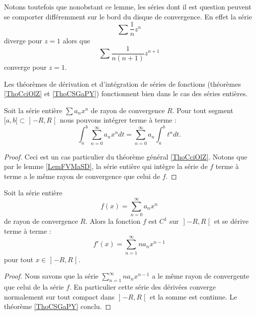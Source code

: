 Notons toutefois que nonobstant ce lemme, les séries dont il est question peuvent se comporter différemment sur le bord du disque de convergence. En effet la série
\begin{equation}
    \sum \frac{1}{ n }z^n
\end{equation}
diverge pour \( z=1\) alors que 
\begin{equation}
    \sum\frac{1}{ n(n+1) }z^{n+1}
\end{equation}
converge pour \( z=1\).


Les théorèmes de dérivation et d'intégration de séries de fonctions (théorèmes \ref{ThoCciOlZ} et \ref{ThoCSGaPY}) fonctionnent bien dans le cas des séries entières.

\begin{proposition} \label{PropfeFQWr}
    Soit la série entière $\sum a_nx^n$ de rayon de convergence \( R\). Pour tout segment \( \mathopen[ a , b \mathclose]\subset\mathopen] -R , R \mathclose[\) nous pouvons intégrer terme à terme :
    \begin{equation}
        \int_a^b\sum_{n=0}^{\infty}a_nx^ndt=\sum_{n=0}^{\infty}a_n\int_a^bt^ndt.
    \end{equation}
\end{proposition}

\begin{proof}
    Ceci est un cas particulier du théorème général \ref{ThoCciOlZ}. Notons que par le lemme \ref{LemFVMaSD}, la série entière qui intègre la série de \( f\) terme à terme a le même rayon de convergence que celui de \( f\).
\end{proof}

\begin{proposition}     \label{ProptzOIuG}
    Soit la série entière
    \begin{equation}
        f(x)=\sum_{n=0}^{\infty}a_n x^n
    \end{equation}
    de rayon de convergence \( R\). Alors la fonction \( f\) est \( C^1\) sur \( \mathopen] -R , R \mathclose[\) et se dérive terme à terme :
    \begin{equation}
        f'(x)=\sum_{n=1}^{\infty}na_nx^{n-1}
    \end{equation}
    pour tout \( x\in\mathopen] -R , R \mathclose[\).
\end{proposition}

\begin{proof}
    Nous savons que la série \( \sum_{n=1}^{\infty}na_nx^{n-1}\) a le même rayon de convergente que celui de la série \( f\). En particulier cette série des dérivées converge normalement sur tout compact dans \( \mathopen] -R , R \mathclose[\) et la somme est continue. Le théorème \ref{ThoCSGaPY} conclu.
\end{proof}

